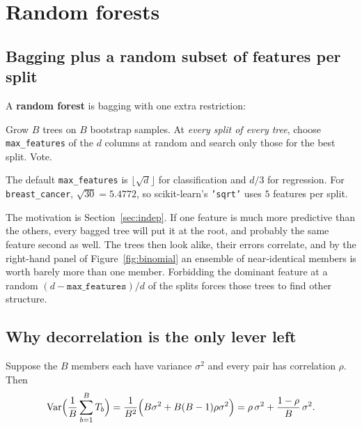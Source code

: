 \documentclass[11pt]{article}
\begin{document}
\notesources{\AMLUnitVISources}

\section{Random forests}
\label{sec:rf}

\subsection{Bagging plus a random subset of features per split}

A \textbf{random forest} is bagging with one extra restriction:

\begin{keyidea}
Grow $B$ trees on $B$ bootstrap samples. At \emph{every split of every tree},
choose \texttt{max\_features} of the $d$ columns at random and search only
those for the best split. Vote.
\end{keyidea}

The default \texttt{max\_features} is $\lfloor\sqrt{d}\rfloor$ for
classification and $d/3$ for regression. For \texttt{breast\_cancer},
$\sqrt{30} = 5.4772$, so scikit-learn's \texttt{'sqrt'} uses $5$ features per
split.

The motivation is Section~\ref{sec:indep}. If one feature is much more
predictive than the others, every bagged tree will put it at the root, and
probably the same feature second as well. The trees then look alike, their
errors correlate, and by the right-hand panel of Figure~\ref{fig:binomial} an
ensemble of near-identical members is worth barely more than one member.
Forbidding the dominant feature at a random $(d - \texttt{max\_features})/d$
of the splits forces those trees to find other structure.

\subsection{Why decorrelation is the only lever left}

Suppose the $B$ members each have variance $\sigma^2$ and every pair has
correlation $\rho$. Then
\begin{equation}
  \operatorname{Var}\Bigl(\frac{1}{B}\sum_{b=1}^{B} T_b\Bigr)
    = \frac{1}{B^2}\Bigl(B\sigma^2 + B(B-1)\rho\sigma^2\Bigr)
    = \rho\,\sigma^2 + \frac{1 - \rho}{B}\,\sigma^2.
  \label{eq:corravg}
\end{equation}
\end{document}
